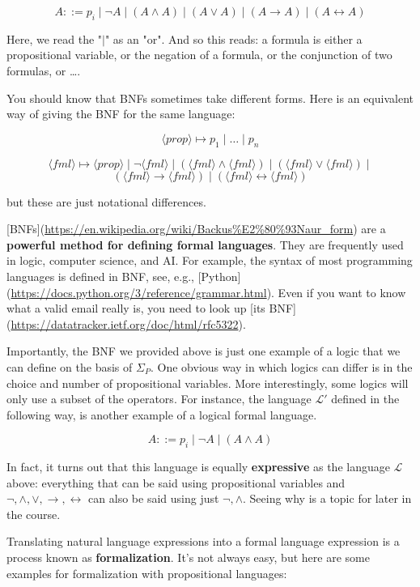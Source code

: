 \documentclass[11pt]{article}
\begin{document}
$$A::= p_i\mid\neg A\mid (A\land A)\mid (A\lor A)\mid (A\rightarrow A)\mid (A\leftrightarrow A)$$

Here, we read the "\(\mid\)" as an "or". And so this reads: a formula is either a
propositional variable, or the negation of a formula, or the conjunction of two
formulas, or \ldots{}.

You should know that BNFs sometimes take different forms. Here is an equivalent
way of giving the BNF for the same language:

$$\langle prop\rangle\mapsto p_1\mid \dots\mid p_n$$

$$\langle fml\rangle\mapsto\langle prop\rangle\mid\neg\langle fml\rangle\mid
(\langle fml\rangle\land \langle fml\rangle)\mid (\langle fml\rangle\lor
\langle fml\rangle)\mid $$
$$(\langle fml\rangle\rightarrow \langle fml\rangle)\mid (\langle
fml\rangle\leftrightarrow \langle fml\rangle)$$

but these are just
notational differences. 

[BNFs](\url{https://en.wikipedia.org/wiki/Backus\%E2\%80\%93Naur\_form}) are a \textbf{\textbf{powerful
method for defining formal languages}}. They are frequently used in logic,
computer science, and AI. For example, the syntax of most programming languages
is defined in BNF, see, e.g.,
[Python](\url{https://docs.python.org/3/reference/grammar.html}). Even if you want to
know what a valid email really is, you need to look up [its
BNF](\url{https://datatracker.ietf.org/doc/html/rfc5322}).

Importantly, the BNF we provided above is just one example of a logic that we can define on the basis of \(\Sigma_P\). One obvious way in which logics can differ is in the choice and number of propositional variables. More interestingly, some logics will only use a subset of the operators. For instance, the language \(\mathcal{L}'\) defined in the following way, is another example of a logical formal language. 

$$A::= p_i\mid\neg A\mid (A\land A)$$

In fact, it turns out that this language is equally \textbf{\textbf{expressive}} as the language \(\mathcal{L}\) above: everything that can be said using propositional variables and
    \(\neg,\land,\lor,\rightarrow,\leftrightarrow\) can also be said using just
    \(\neg,\land\). Seeing why is a topic for later in the course.

Translating natural language expressions into a formal language expression is
a process known as \textbf{\textbf{formalization}}. It's not always easy, but here are some
examples for formalization with propositional languages:
\end{document}
